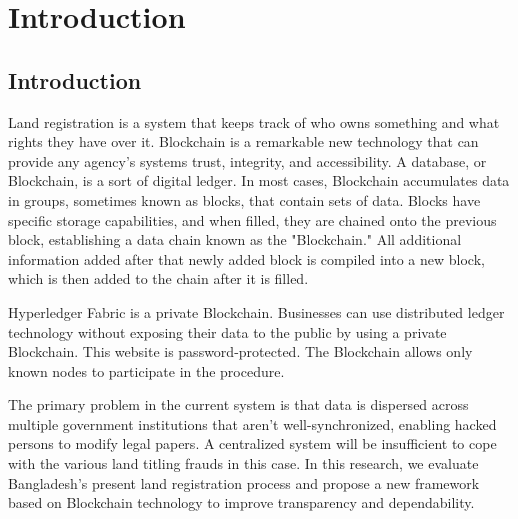 \documentclass[12pt]{ucthesis}
\begin{document}
\begin{frontmatter}
   
   




\listoftables
\listoffigures
\listofabbreviations

\tableofcontents
\end{frontmatter}
\pagestyle{plain}
\renewcommand{\baselinestretch}{1.66}


\chapter{Introduction}
\label{introduction}

\section{Introduction}
\label{introductionintro}
 Land registration is a system that keeps track of who owns something and what rights they have over it. Blockchain is a remarkable new technology that can provide any agency's systems trust, integrity, and accessibility. A database, or Blockchain, is a sort of digital ledger. In most cases, Blockchain accumulates data in groups, sometimes known as blocks, that contain sets of data. Blocks have specific storage capabilities, and when filled, they are chained onto the previous block, establishing a data chain known as the "Blockchain." All additional information added after that newly added block is compiled into a new block, which is then added to the chain after it is filled\cite{ref15}.

Hyperledger Fabric is a private Blockchain. Businesses can use distributed ledger technology without exposing their data to the public by using a private Blockchain. This website is password-protected. The Blockchain allows only known nodes to participate in the procedure\cite{rf4}.

The primary problem in the current system is that data is dispersed across multiple government institutions that aren't well-synchronized, enabling hacked persons to modify legal papers. A centralized system will be insufficient to cope with the various land titling frauds in this case\cite{rf3}. In this research, we evaluate Bangladesh's present land registration process and propose a new framework based on Blockchain technology to improve transparency and dependability\cite{rf1}.
\end{document}
